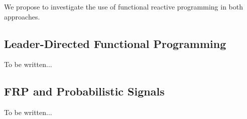 We propose to investigate the use of functional reactive programming in both approaches.

%

\subsection{Leader-Directed Functional Programming}

To be written...

%

\subsection{FRP and Probabilistic Signals}

To be written...

